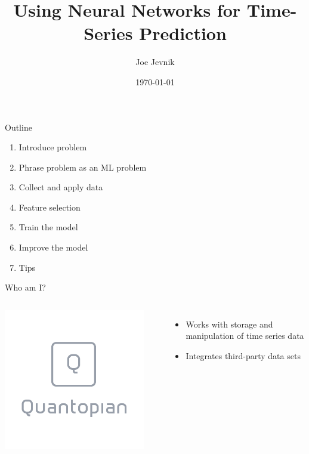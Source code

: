 \documentclass[table]{beamer}
\title{Using Neural Networks for Time-Series Prediction}
\date{\today}
\author{Joe Jevnik}
\institute{PyData NYC 2017}
\begin{document}
\maketitle

\begin{frame}{Outline}
  \begin{enumerate}
  \item Introduce problem
  \item Phrase problem as an ML problem
  \item Collect and apply data
  \item Feature selection
  \item Train the model
  \item Improve the model
  \item Tips
  \end{enumerate}
\end{frame}

\begin{frame}{Who am I?}
  \begin{columns}
    \begin{center}
      \includegraphics[width=0.90\textwidth]{images/quantopian.png}
    \end{center}

    \begin{itemize}
    \item Works with storage and manipulation of time series data
    \item Integrates third-party data sets
    \end{itemize}
  \end{columns}
\end{frame}
\end{document}
